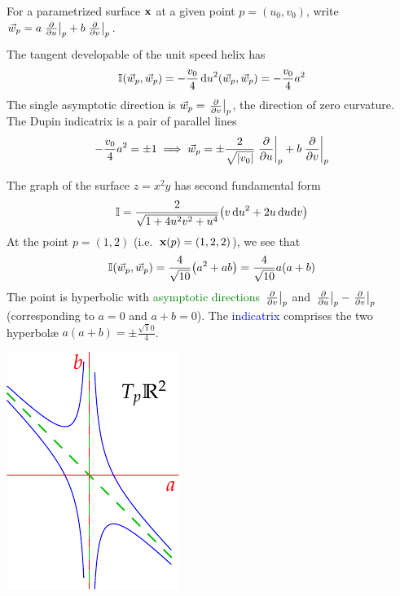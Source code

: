 \begin{examples}{}{}
	For a parametrized surface ${\mathbf{x}}$ at a given point $p=(u_0,v_0)$, write $\vec w_p=\smash[b]{a\left.\frac{\partial }{\partial u}\right|_{p}+b\left.\frac{\partial }{\partial v}\right|_{p}}$.
	\begin{enumerate}
	  \item The tangent developable of the unit speed helix has
		\[
			\mathbb{I}(\vec w_p,\vec w_p) =-\frac{v_0}4\,{\mathrm{d} u}^2(\vec w_p,\vec w_p) =-\frac{v_0}4a^2
		\]
		The single asymptotic direction is $\vec w_p=\smash{\left.\frac{\partial }{\partial v}\right|_{p}}$, the direction of zero curvature. The Dupin indicatrix is a pair of parallel lines
		\[
			-\frac{v_0}4a^2=\pm 1\implies \vec w_p=\pm\frac 2{\sqrt{\left| v_0\right|}}\left.\frac{\partial }{\partial u}\right|_{p}+b\left.\frac{\partial }{\partial v}\right|_{p}
		\]
		
		\begin{minipage}[t]{0.75\linewidth}\vspace{0pt}
			\item The graph of the surface $z=x^2y$ has second fundamental form
			\[
				\mathbb{I}=\frac{2}{\sqrt{1+4u^2v^2+u^4}}\bigl(v\,{\mathrm{d} u}^2+2u\,{\mathrm{d} u}{\mathrm{d} v}\bigr)
			\]
			At the point $p=(1,2)$ (i.e.\ ${\mathbf{x}}(p)=(1,2,2)$), we see that
			\[
				\mathbb{I}(\vec w_p,\vec w_p) =\frac 4{\sqrt{10}}\bigl(a^2+ab\bigr) =\frac 4{\sqrt{10}}a(a+b)
			\]
			The point is hyperbolic with \textcolor{Green}{asymptotic directions} $\left.\frac{\partial }{\partial v}\right|_{p}$ and $\left.\frac{\partial }{\partial u}\right|_{p}-\left.\frac{\partial }{\partial v}\right|_{p}$ (corresponding to $a=0$ and $a+b=0$). The \textcolor{blue}{indicatrix} comprises the two hyperbolæ $a(a+b)=\pm\frac{\sqrt 10}4$.
		\end{minipage}
		\hfill
		\begin{minipage}[t]{0.24\linewidth}\vspace{0pt}
			\flushright\includegraphics{euler-indicatrix}
		\end{minipage}
	\end{enumerate}
\end{examples}


